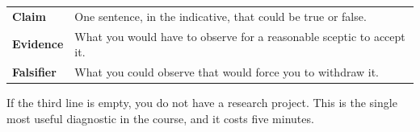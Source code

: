 \begin{center}
\small
\begin{tabular}{@{}L{2.6cm}L{11.7cm}@{}}
\toprule
\textbf{Claim} & One sentence, in the indicative, that could be true or false. \\
\textbf{Evidence} & What you would have to observe for a reasonable sceptic to
                    accept it. \\
\textbf{Falsifier} & What you could observe that would force you to withdraw
                     it. \\
\bottomrule
\end{tabular}
\end{center}

If the third line is empty, you do not have a research project. This is the
single most useful diagnostic in the course, and it costs five minutes.


